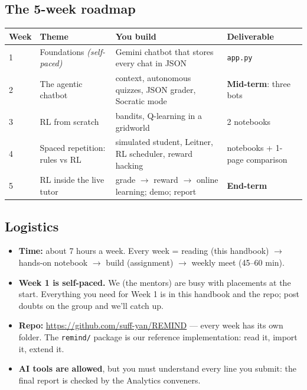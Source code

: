 \subsection{The 5-week roadmap}
\begin{center}
\renewcommand{\arraystretch}{1.25}
\begin{tabular}{@{}p{1.1cm}p{4.1cm}p{5.2cm}p{4.1cm}@{}}
\toprule
\textbf{Week} & \textbf{Theme} & \textbf{You build} & \textbf{Deliverable}\\
\midrule
1 & Foundations \newline\textit{(self-paced)} & Gemini chatbot that stores every chat in JSON & \texttt{app.py}\\
2 & The agentic chatbot & context, autonomous quizzes, JSON grader, Socratic mode & \textbf{Mid-term}: three bots\\
3 & RL from scratch & bandits, Q-learning in a gridworld & 2 notebooks\\
4 & Spaced repetition: rules vs RL & simulated student, Leitner, RL scheduler, reward hacking & notebooks + 1-page comparison\\
5 & RL inside the live tutor & grade $\rightarrow$ reward $\rightarrow$ online learning; demo; report & \textbf{End-term}\\
\bottomrule
\end{tabular}
\end{center}

\subsection{Logistics}
\begin{itemize}
  \item \textbf{Time:} about 7 hours a week. Every week = reading (this handbook) $\rightarrow$ hands-on notebook
        $\rightarrow$ build (assignment) $\rightarrow$ weekly meet (45--60 min).
  \item \textbf{Week 1 is self-paced.} We (the mentors) are busy with placements at the start. Everything you need
        for Week 1 is in this handbook and the repo; post doubts on the group and we'll catch up.
  \item \textbf{Repo:} \url{https://github.com/suff-yan/REMIND} --- every week has its own folder. The \texttt{remind/}
        package is our reference implementation: read it, import it, extend it.
  \item \textbf{AI tools are allowed}, but you must understand every line you submit: the final report is checked
        by the Analytics conveners.
\end{itemize}

